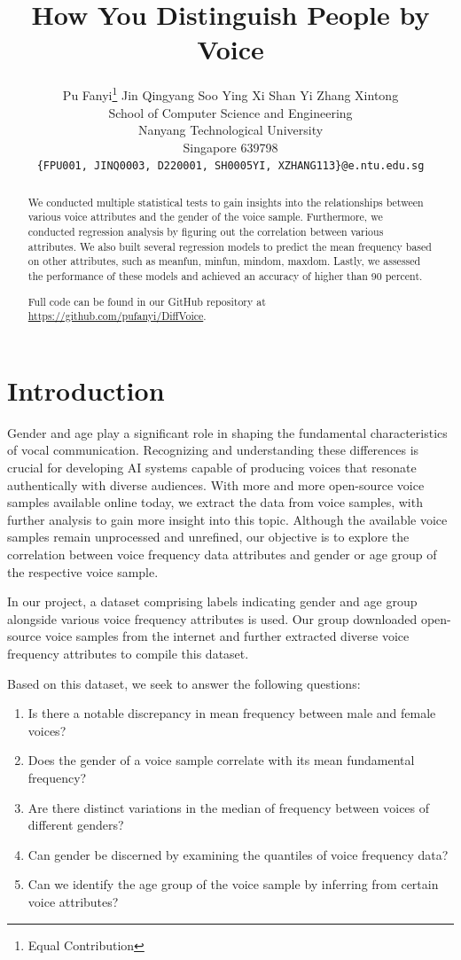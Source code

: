 \documentclass{article}
\title{How You Distinguish People by Voice}
\author{%
	Pu Fanyi\thanks{Equal Contribution} \hspace{1em} Jin Qingyang\footnotemark[1] \hspace{1em} Soo Ying Xi\footnotemark[1] \hspace{1em} Shan Yi\footnotemark[1] \hspace{1em} Zhang Xintong\footnotemark[1] \\
	School of Computer Science and Engineering\\
	Nanyang Technological University\\
	Singapore 639798 \\
	\texttt{\{FPU001, JINQ0003, D220001, SH0005YI, XZHANG113\}@e.ntu.edu.sg} \\
}
\begin{document}
	
	
	\newpage
	
	
	\maketitle
	
	
	\begin{abstract}
		We conducted multiple statistical tests to gain insights into the relationships between various voice attributes and the gender of the voice sample. Furthermore, we conducted regression analysis by figuring out the correlation between various attributes. We also built several regression models to predict the mean frequency based on other attributes, such as meanfun, minfun, mindom, maxdom. Lastly, we assessed the performance of these models and achieved an accuracy of higher than 90 percent.
		
		Full code can be found in our GitHub repository at \url{https://github.com/pufanyi/DiffVoice}.
	\end{abstract}
	
	
	\section{Introduction}
	Gender and age play a significant role in shaping the fundamental characteristics of vocal communication. Recognizing and understanding these differences is crucial for developing AI systems capable of producing voices that resonate authentically with diverse audiences. With more and more open-source voice samples available online today, we extract the data from voice samples, with further analysis to gain more insight into this topic. Although the available voice samples remain unprocessed and unrefined, our objective is to explore the correlation between voice frequency data attributes and gender or age group of the respective voice sample.
	
	In our project, a dataset comprising labels indicating gender and age group alongside various voice frequency attributes is used. Our group downloaded open-source voice samples from the internet and further extracted diverse voice frequency attributes to compile this dataset.
	
	Based on this dataset, we seek to answer the following questions:
	\begin{enumerate}
		\item Is there a notable discrepancy in mean frequency between male and female voices?
		\item Does the gender of a voice sample correlate with its mean fundamental frequency?
		\item Are there distinct variations in the median of frequency between voices of different genders?
		\item Can gender be discerned by examining the quantiles of voice frequency data?
		\item Can we identify the age group of the voice sample by inferring from certain voice attributes?
	\end{enumerate}
	
\end{document}
